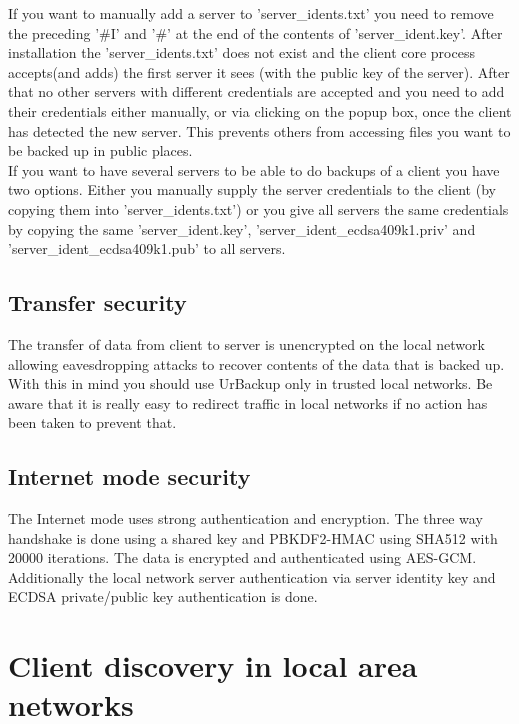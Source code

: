 \documentclass[a4paper,10pt]{article}
\begin{document}
If you want to manually add a server to 'server\_idents.txt' you need to remove the preceding '\#I' and '\#' at the end of the contents of 'server\_ident.key'. After installation the 'server\_idents.txt' does not exist and the client core process accepts(and adds) the first server it sees (with the public key of the server). After that no other servers with different credentials are accepted and you need to add their credentials either manually, or via clicking on the popup box, once the client has detected the new server. This prevents others from accessing files you want to be backed up in public places.\\
If you want to have several servers to be able to do backups of a client you have two options. Either you manually supply the server credentials to the client (by copying them into 'server\_idents.txt') or you give all servers the same credentials by copying the same 'server\_ident.key', 'server\_ident\_ecdsa409k1.priv' and 'server\_ident\_ecdsa409k1.pub' to all servers.

\subsection{Transfer security}

The transfer of data from client to server is unencrypted on the local
network allowing eavesdropping attacks to recover contents of the data that is
backed up. With this in mind you should use UrBackup only in trusted local
networks. Be aware that it is really easy to redirect traffic in local networks if no action has been taken to prevent that.

\subsection{Internet mode security}

The Internet mode uses strong authentication and encryption. The three way
handshake is done using a shared key and PBKDF2-HMAC using SHA512 with 20000
iterations. The data is encrypted and authenticated using AES-GCM. Additionally the local network server authentication via server identity key and ECDSA private/public key authentication is done.


\section{Client discovery in local area networks}
\label{client_discovery}
\end{document}
